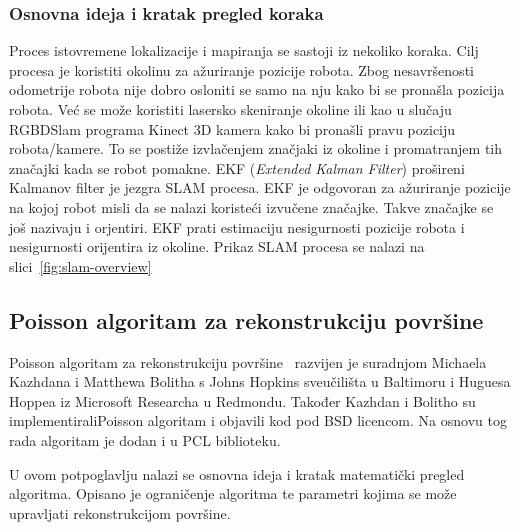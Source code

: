 \subsubsection{Osnovna ideja i kratak pregled koraka} %
\label{ssub:Osnovna ideja }
Proces istovremene lokalizacije i mapiranja se sastoji iz nekoliko
koraka. Cilj procesa je koristiti okolinu za ažuriranje pozicije robota.
Zbog nesavršenosti odometrije robota nije dobro osloniti se samo na nju
kako bi se pronašla pozicija robota. Već se može koristiti lasersko
skeniranje okoline ili kao u slučaju RGBDSlam programa Kinect 3D kamera
kako bi pronašli pravu poziciju robota/kamere. To se postiže
izvlačenjem značjaki iz okoline i promatranjem tih značajki kada se
robot pomakne. EKF (\textit{Extended Kalman Filter}) prošireni Kalmanov
filter je jezgra SLAM procesa. EKF je odgovoran za ažuriranje pozicije
na kojoj robot misli da se nalazi koristeći izvučene značajke. Takve
značajke se još nazivaju i orjentiri. EKF prati estimaciju nesigurnosti
pozicije robota i nesigurnosti orijentira iz okoline. Prikaz SLAM
procesa se nalazi na slici~\ref{fig:slam-overview}


\newpage
\subsection{Poisson algoritam za rekonstrukciju površine} %
\label{sub:Poisson}
Poisson algoritam za rekonstrukciju površine~\cite{Kazhdan:2006}
razvijen je suradnjom Michaela Kazhdana i Matthewa Bolitha s Johns
Hopkins sveučilišta u Baltimoru i Huguesa Hoppea iz Microsoft Researcha
u Redmondu. Također Kazhdan i Bolitho su implementirali\footnotemark[1]
Poisson algoritam i objavili kod pod BSD licencom. Na osnovu tog rada
algoritam je dodan i u PCL biblioteku.

U ovom potpoglavlju nalazi se osnovna ideja i kratak matematički pregled
algoritma. Opisano je ograničenje algoritma te parametri kojima se može
upravljati rekonstrukcijom površine.




